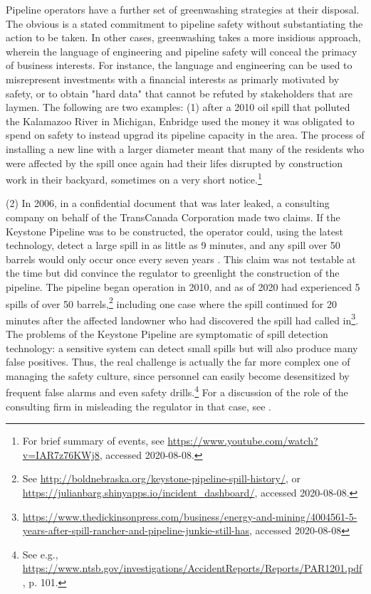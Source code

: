 \documentclass[12pt, man, natbib]{apa6}
\begin{document}
	Pipeline operators have a further set of greenwashing strategies at their disposal. The obvious is a stated commitment to pipeline safety without substantiating the action to be taken. In other cases, greenwashing takes a more insidious approach, wherein the language of engineering and pipeline safety will conceal the primacy of business interests. For instance, the language and engineering can be used to misrepresent investments with a financial interests as primarly motivated by safety, or to obtain "hard data" that cannot be refuted by stakeholders that are laymen. The following are two examples: (1) after a 2010 oil spill that polluted the Kalamazoo River in Michigan, Enbridge used the money it was obligated to spend on safety to instead upgrad its pipeline capacity in the area. The process of installing a new line with a larger diameter meant that many of the residents who were affected by the spill once again had their lifes disrupted by construction work in their backyard, sometimes on a very short notice.\footnote{For brief summary of events, see \url{https://www.youtube.com/watch?v=IAR7z76KWj8}, accessed 2020-08-08.}
	
	(2) In 2006, in a confidential document that was later leaked, a consulting company on behalf of the TransCanada Corporation made two claims. If the Keystone Pipeline was to be constructed, the operator could, using the latest technology, detect a large spill in as little as 9 minutes, and any spill over 50 barrels would only occur once every seven years \citep{Consulting2006}. This claim was not testable at the time but did convince the regulator to greenlight the construction of the pipeline. The pipeline began operation in 2010, and as of 2020 had experienced 5 spills of over 50 barrels,\footnote{See \url{http://boldnebraska.org/keystone-pipeline-spill-history/}, or \url{https://julianbarg.shinyapps.io/incident_dashboard/}, accessed 2020-08-08.} including one case where the spill continued for 20 minutes after the affected landowner who had discovered the spill had called in\footnote{\url{https://www.thedickinsonpress.com/business/energy-and-mining/4004561-5-years-after-spill-rancher-and-pipeline-junkie-still-has}, accessed 2020-08-08}. The problems of the Keystone Pipeline are symptomatic of spill detection technology: a sensitive system can detect small spills but will also produce many false positives. Thus, the real challenge is actually the far more complex one of managing the safety culture, since personnel can easily become desensitized by frequent false alarms and even safety drills.\footnote{See e.g., \url{https://www.ntsb.gov/investigations/AccidentReports/Reports/PAR1201.pdf}, p. 101.} For a discussion of the role of the consulting firm in misleading the regulator in that case, see \citet{Stansbury2011}.
\end{document}
